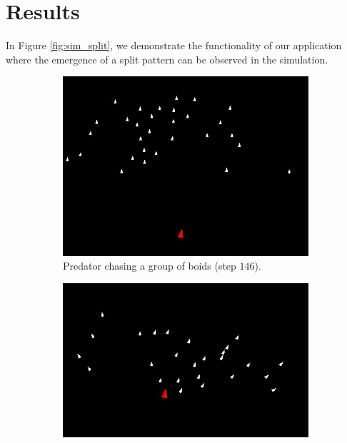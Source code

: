\documentclass[9pt]{pnas-new}
\begin{document}
\section*{Results}

In Figure \ref{fig:sim_split}, we demonstrate the functionality of our application
where the emergence of a split pattern can be observed in the simulation.
\begin{figure}[h]
    \centering
    \begin{subfigure}[t]{0.3\linewidth}
        \includegraphics[width=\linewidth]{boids_step_146.jpg}
        \caption{Predator chasing a group of boids (step $146$).}
    \end{subfigure}%
    \hspace{0.02\linewidth} %
    \begin{subfigure}[t]{0.3\linewidth}
        \includegraphics[width=\linewidth]{boids_step_233.jpg}

\end{subfigure}
\end{figure}
\end{document}
